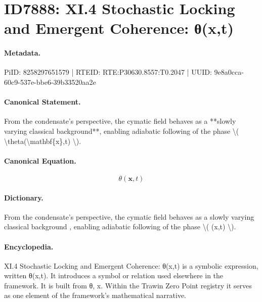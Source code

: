 \section*{ID7888: XI.4 Stochastic Locking and Emergent Coherence: θ(x,t)}
\paragraph{Metadata.}
PiID: 8258297651579 | RTEID: RTE:P30630.8557:T0.2047 | UUID: 9e8a0cca-60c9-537e-bbe6-39b33520aa2e

\paragraph{Canonical Statement.}
From the condensate’s perspective, the cymatic field behaves as a **slowly varying classical background**, enabling adiabatic following of the phase \textbackslash{}( \textbackslash{}theta(\textbackslash{}mathbf\{x\},t) \textbackslash{}).

\paragraph{Canonical Equation.}
\[
\theta(\mathbf{x},t)
\]

\paragraph{Dictionary.}
From the condensate’s perspective, the cymatic field behaves as a slowly varying classical background , enabling adiabatic following of the phase \textbackslash{}( (x,t) \textbackslash{}).

\paragraph{Encyclopedia.}
XI.4 Stochastic Locking and Emergent Coherence: θ(x,t) is a symbolic expression, written θ(x,t). It introduces a symbol or relation used elsewhere in the framework. It is built from θ, x. Within the Trawin Zero Point registry it serves as one element of the framework's mathematical narrative.
